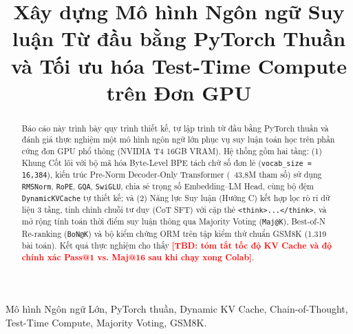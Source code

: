 \documentclass[conference]{IEEEtran}
\newcommand{\tbd}[1]{\textcolor{red}{\textbf{[TBD: #1]}}}
\begin{document}
\title{Xây dựng Mô hình Ngôn ngữ Suy luận Từ đầu bằng PyTorch Thuần và Tối ưu hóa Test-Time Compute trên Đơn GPU}

\author{
}

\maketitle

\begin{abstract}
Báo cáo này trình bày quy trình thiết kế, tự lập trình từ đầu bằng PyTorch thuần và đánh giá thực nghiệm một mô hình ngôn ngữ lớn phục vụ suy luận toán học trên phần cứng đơn GPU phổ thông (NVIDIA T4 16GB VRAM). Hệ thống gồm hai tầng: (1) Khung Cốt lõi với bộ mã hóa Byte-Level BPE tách chữ số đơn lẻ (\texttt{vocab\_size = 16,384}), kiến trúc Pre-Norm Decoder-Only Transformer (~43,8M tham số) sử dụng \texttt{RMSNorm}, \texttt{RoPE}, \texttt{GQA}, \texttt{SwiGLU}, chia sẻ trọng số Embedding--LM Head, cùng bộ đệm \texttt{DynamicKVCache} tự thiết kế; và (2) Năng lực Suy luận (Hướng C) kết hợp lọc rò rỉ dữ liệu 3 tầng, tinh chỉnh chuỗi tư duy (CoT SFT) với cặp thẻ \texttt{<think>...</think>}, và mở rộng tính toán thời điểm suy luận thông qua Majority Voting (\texttt{Maj@K}), Best-of-N Re-ranking (\texttt{BoN@K}) và bộ kiểm chứng ORM trên tập kiểm thử chuẩn GSM8K (1.319 bài toán). Kết quả thực nghiệm cho thấy \tbd{tóm tắt tốc độ KV Cache và độ chính xác Pass@1 vs. Maj@16 sau khi chạy xong Colab}.
\end{abstract}

\begin{IEEEkeywords}
Mô hình Ngôn ngữ Lớn, PyTorch thuần, Dynamic KV Cache, Chain-of-Thought, Test-Time Compute, Majority Voting, GSM8K.
\end{IEEEkeywords}











\end{document}
